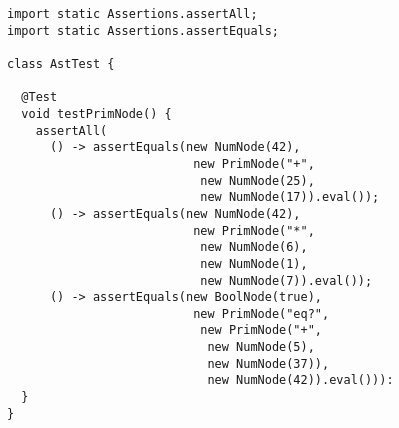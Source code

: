 \begin{lstlisting}[language=MyJava]
import static Assertions.assertAll;
import static Assertions.assertEquals;

class AstTest {

  @Test
  void testPrimNode() {
    assertAll(
      () -> assertEquals(new NumNode(42),
                          new PrimNode("+", 
                           new NumNode(25), 
                           new NumNode(17)).eval());
      () -> assertEquals(new NumNode(42),
                          new PrimNode("*", 
                           new NumNode(6), 
                           new NumNode(1), 
                           new NumNode(7)).eval());
      () -> assertEquals(new BoolNode(true),
                          new PrimNode("eq?",
                           new PrimNode("+", 
                            new NumNode(5),
                            new NumNode(37)),
                            new NumNode(42)).eval())):
  }
}
\end{lstlisting}

